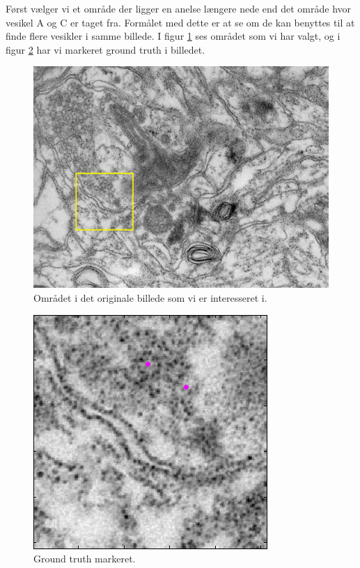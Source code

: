 Først vælger vi et område der ligger en anelse længere nede end det område hvor vesikel A og C er taget fra. Formålet med dette er at se om de kan benyttes til at finde flere vesikler i samme billede. I figur \ref{fig:postmethod_conv_area3} ses området som vi har valgt, og i figur \ref{fig:postmethod_conv_gt3} har vi markeret ground truth i billedet.

\begin{figure}[H]
		\centering
		\includegraphics[scale=0.5]{files/postmethod/img/area_3.png}
	\caption{Området i det originale billede som vi er interesseret i.\label{fig:postmethod_conv_area3}}
\end{figure}

\begin{figure}[H]
		\centering
		\includegraphics[scale=0.65]{files/postmethod/img/ground_truth3.png}
	\caption{Ground truth markeret.\label{fig:postmethod_conv_gt3}}
\end{figure}

